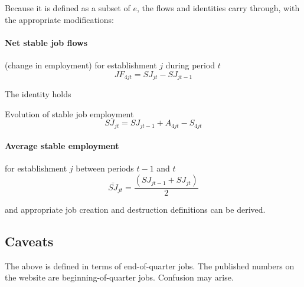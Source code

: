 Because it is defined as a subset of $e$, the flows and identities carry
through, with the appropriate modifications:


\paragraph{Net stable job flows}

(change in employment) for establishment $j$ during period $t$%
\begin{equation}
JF_{4jt}=SJ_{jt}-SJ_{jt-1}  \label{eq:JF4jt}
\end{equation}

The identity holds

\begin{definition}
Evolution of stable job employment 
\begin{equation*}
SJ_{jt} = SJ_{jt-1} + A_{4jt} - S_{4jt}
\end{equation*}
\end{definition}

\paragraph{Average stable  employment}

for establishment $j$ between periods $t-1$ and $t$%
\begin{equation}
\bar{SJ}_{jt}=\frac{\left( SJ_{jt-1}+SJ_{jt}\right) }{2}  \label{eq:sjbarjt}
\end{equation}

and appropriate job creation and destruction definitions can be derived.


\subsection{Caveats}

The above is defined in terms of end-of-quarter jobs. The published numbers
on the website are beginning-of-quarter jobs. Confusion may arise.

